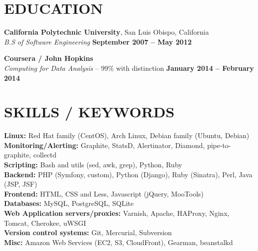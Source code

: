 \documentclass[margin,line]{resume}
\begin{document}
\begin{resume}
    \vspace{-4mm}

\sectionline

    \section{\mysidestyle \textbf{\large{E}\small{DUCATION}}}

    \textbf{\listing California Polytechnic University}, San Luis Obispo, California \vspace{1mm}\\
    \textsl{B.S of Software Engineering} \hfill \textbf{September 2007 -- May 2012}\vspace{-3mm}\\\vspace{-1mm}%

    \textbf{\listing Coursera / John Hopkins} \vspace{1mm}\\
    \textsl{Computing for Data Analysis} -- 99\% with distinction \hfill \textbf{January 2014 -- February 2014}\vspace{-3mm}\\\vspace{-1mm}%

    \vspace{-1mm}

\sectionline

    \section{\mysidestyle \textbf{\large{S}\small{KILLS} / \large{K}\small{EYWORDS}}}

    \textbf{Linux:} Red Hat family (CentOS), Arch Linux, Debian family (Ubuntu, Debian)\\
    \textbf{Monitoring/Alerting:} Graphite, StatsD, Alertinator, Diamond, pipe-to-graphite, collectd\\
    \textbf{Scripting:} Bash and utils (sed, awk, grep), Python, Ruby\\
    \textbf{Backend:} PHP (Symfony, custom), Python (Django), Ruby (Sinatra), Perl, Java (JSP, JSF)\\
    \textbf{Frontend:} HTML, CSS and Less, Javascript (jQuery, MooTools)\\
    \textbf{Databases:} MySQL, PostgreSQL, SQLite\\
    \textbf{Web Application servers/proxies:} Varnish, Apache, HAProxy, Nginx, Tomcat, Cherokee, uWSGI\\
    \textbf{Version control systems:} Git, Mercurial, Subversion\\
    \textbf{Misc:} Amazon Web Services (EC2, S3, CloudFront), Gearman, beanstalkd



\end{resume}
\end{document}
